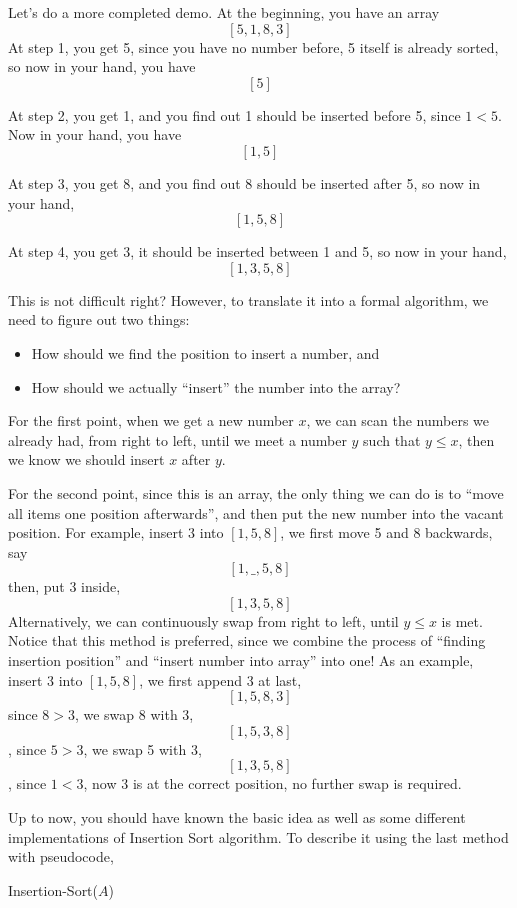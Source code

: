 \begin{spacing}{1.3}
    Let's do a more completed demo. At the beginning, you have an array
    $$[5,1,8,3]$$
    At step 1, you get 5, since you have no number before, 5 itself is already sorted,
    so now in your hand, you have $$[5]$$

    At step 2, you get 1, and you find out 1 should be inserted before 5, since $1<5$.
    Now in your hand, you have $$[1,5]$$

    At step 3, you get 8, and you find out 8 should be inserted after 5, so now in your hand,
    $$[1, 5, 8]$$

    At step 4, you get 3, it should be inserted between 1 and 5, so now in your hand, 
    $$[1,3,5,8]$$

    This is not difficult right? However, to translate it into a formal algorithm, 
    we need to figure out two things:
    \begin{itemize}
        \item How should we find the position to insert a number, and
        \item How should we actually ``insert'' the number into the array?
    \end{itemize}

    For the first point, when we get a new number $x$, we can scan the numbers we already had, 
    from right to left, until we meet a number $y$ such that $y\le x$, then 
    we know we should insert $x$ after $y$.

    For the second point, since this is an array, the only thing we can do is to 
    ``move all items one position afterwards'', and then put the new number into the vacant position.
    For example, insert $3$ into $[1,5,8]$, we first move 5 and 8 backwards, say 
    $$[1, \_, 5, 8]$$
    then, put 3 inside, $$[1,3,5,8]$$
    Alternatively, we can continuously swap from right to left, until $y\le x$ is met. 
    Notice that this method is preferred, since we combine the process of ``finding 
    insertion position'' and ``insert number into array'' into one!
    As an example, insert 3 into $[1,5,8]$, we first append 3 at last,
    $$[1,5,8,3]$$
    since $8>3$, we swap 8 with 3, $$[1,5,3,8]$$,
    since $5>3$, we swap 5 with 3, $$[1,3,5,8]$$,
    since $1<3$, now 3 is at the correct position, no further swap is required.

    Up to now, you should have known the basic idea as well as some different implementations 
    of Insertion Sort algorithm. To describe it using the last method with pseudocode,
    
    \begin{algorithm*}[htbp]
        \caption{Insertion-Sort($A$)}


\end{algorithm*}
\end{spacing}
